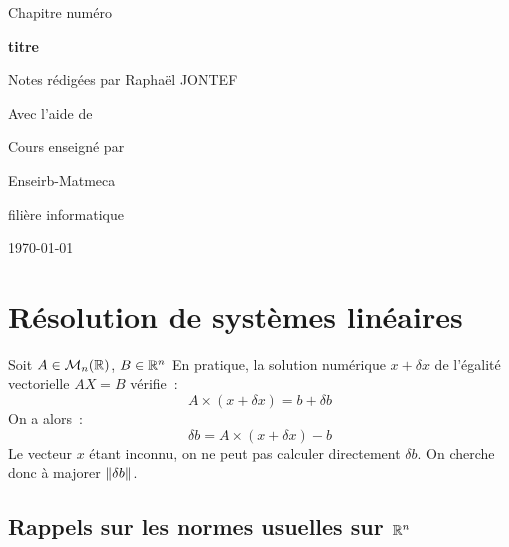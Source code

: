 

\newcommand{\titrechapitre}{titre}
\newcommand{\numerochapitre}{numéro}

\renewcommand{\headrulewidth}{0.4pt}
\renewcommand{\footrulewidth}{0.4pt}
\fancyfoot[C]{\thepage}
\fancyhead[R]{\titrechapitre}




\setlength{\headheight}{15pt}
\begin{titlepage}
    \centering
    \vspace*{3cm}
    {\huge Chapitre \numerochapitre\par}
    {\Huge \bfseries\titrechapitre\par}
    \vspace{2cm}
    {\Large Notes rédigées par Raphaël JONTEF\par}
{\Large Avec l'aide de \par}
    \vspace{0.5cm}
    {\normalsize Cours enseigné par \par}
    \vspace{4cm}
    {\small Enseirb-Matmeca\par}
    {\small filière informatique\par}
    \vfill
    {\large \today\par}
\end{titlepage}

\tableofcontents
\newpage



\section{Résolution de systèmes linéaires}

Soit $A \in \mathcal{M}_{n}(\mathbb{R})$, $B \in \mathbb{R}^n$
En pratique, la solution numérique $x + \delta x$ de l'égalité vectorielle $AX = B$ vérifie~:
$$A\times(x+\delta x) = b + \delta b$$
On a alors~:
$$\delta b = A\times(x + \delta x) - b$$
Le vecteur $x$ étant inconnu, on ne peut pas calculer directement $\delta b$. On cherche donc à majorer $\lVert\delta b\rVert$.\\\par

\subsection{Rappels sur les normes usuelles sur $\mathbb{R}^n$}


